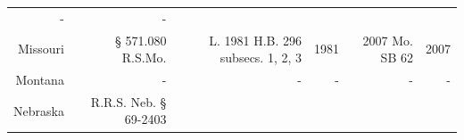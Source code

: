 \documentclass[]{article}
\begin{document}
\begin{longtable}[c]{@{}rrrrrr@{}}
\begin{minipage}[t]{0.10\columnwidth}
-
\strut\end{minipage} &
\begin{minipage}[t]{0.10\columnwidth}\raggedleft\strut
-
\strut\end{minipage}\tabularnewline
\begin{minipage}[t]{0.10\columnwidth}\raggedleft\strut
Missouri
\strut\end{minipage} &
\begin{minipage}[t]{0.21\columnwidth}\raggedleft\strut
§ 571.080 R.S.Mo.
\strut\end{minipage} &
\begin{minipage}[t]{0.22\columnwidth}\raggedleft\strut
L. 1981 H.B. 296 subsecs. 1, 2, 3
\strut\end{minipage} &
\begin{minipage}[t]{0.10\columnwidth}\raggedleft\strut
1981
\strut\end{minipage} &
\begin{minipage}[t]{0.10\columnwidth}\raggedleft\strut
2007 Mo. SB 62
\strut\end{minipage} &
\begin{minipage}[t]{0.10\columnwidth}\raggedleft\strut
2007
\strut\end{minipage}\tabularnewline
\begin{minipage}[t]{0.10\columnwidth}\raggedleft\strut
Montana
\strut\end{minipage} &
\begin{minipage}[t]{0.21\columnwidth}\raggedleft\strut
-
\strut\end{minipage} &
\begin{minipage}[t]{0.22\columnwidth}\raggedleft\strut
-
\strut\end{minipage} &
\begin{minipage}[t]{0.10\columnwidth}\raggedleft\strut
-
\strut\end{minipage} &
\begin{minipage}[t]{0.10\columnwidth}\raggedleft\strut
-
\strut\end{minipage} &
\begin{minipage}[t]{0.10\columnwidth}\raggedleft\strut
-
\strut\end{minipage}\tabularnewline
\begin{minipage}[t]{0.10\columnwidth}\raggedleft\strut
Nebraska
\strut\end{minipage} &
\begin{minipage}[t]{0.21\columnwidth}\raggedleft\strut
R.R.S. Neb. § 69-2403
\strut\end{minipage} &

\end{longtable}
\end{document}
